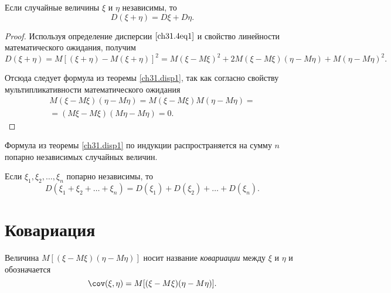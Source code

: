 \begin{thm}\label{ch31.disp1}
Если случайные величины $\xi$ и $\eta$ независимы, то $$D(\xi + \eta) = D\xi + D\eta.$$
\end{thm}
\begin{proof}
Используя определение дисперсии $\eqref{ch31.4eq1}$ и свойство линейности математического ожидания, получим
$$
D(\xi + \eta) = M[(\xi + \eta) - M(\xi + \eta)]^2 = M(\xi - M\xi)^2 + 2M(\xi - M\xi)(\eta - M\eta) + M(\eta  - M\eta)^2.
$$

Отсюда следует формула из теоремы \ref{ch31.disp1}, так как согласно свойству мультипликативности математического ожидания
\begin{multline*}
M(\xi - M\xi)(\eta - M\eta) = M(\xi - M\xi)M(\eta - M\eta) =\\= (M\xi - M\xi)(M\eta - M\eta) = 0.\tag*{\qedhere}
\end{multline*}
\end{proof}

Формула из теоремы \ref{ch31.disp1} по индукции распространяется на сумму $n$ попарно независимых случайных величин. 
\begin{cons}\label{ch31.disp13}
Если $\xi_1,\xi_2, \ldots, \xi_n$ попарно независимы, то 
$$
D(\xi_1 + \xi_2 + \ldots + \xi_n) = D(\xi_1) + D(\xi_2) + \ldots + D(\xi_n).
$$
\end{cons}

\section{Ковариация}
\begin{defn}
Величина $M[(\xi - M\xi)(\eta - M\eta)]$ носит название \textit{ковариации} между $\xi$ и $\eta$ и обозначается $$\cov (\xi,\eta) = M[(\xi - M\xi)(\eta - M\eta)].$$
\end{defn}

